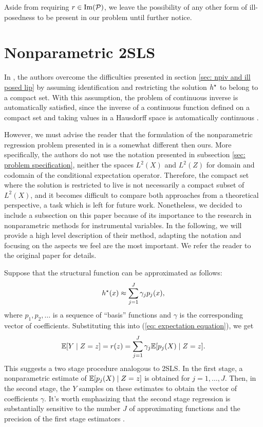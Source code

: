 Aside from requiring $ r \in \operatorname{Im} ( \mathcal{P} ) $, we leave the possibility of any other form of ill-posedness to be present in our problem until further notice.

\section{Nonparametric 2SLS}

In \cite{newey2003}, the authors overcome the difficulties presented in section \ref{sec: npiv and ill posed lip} by assuming identification and restricting the solution $ h^{ \star } $ to belong to a compact set.
With this assumption, the problem of continuous inverse is automatically satisfied, since the inverse of a continuous function defined on a compact set and taking values in a Hausdorff space is automatically continuous \cite{munkres2000}.

However, we must advise the reader that the formulation of the nonparametric regression problem presented in \cite{newey2003} is a somewhat different then ours.
More specifically, the authors do not use the notation presented in subsection \ref{sec: problem specification}, neither the spaces $ L^2 ( X ) $ and $ L^2 ( Z ) $ for domain and codomain of the conditional expectation operator.
Therefore, the compact set where the solution is restricted to live is not necessarily a compact subset of $ L^{ 2 } ( X ) $, and it becomes difficult to compare both approaches from a theoretical perspective, a task which is left for future work.
Nonetheless, we decided to include a subsection on this paper because of its importance to the research in nonparametric methods for instrumental variables.
In the following, we will provide a high level description of their method, adapting the notation and focusing on the aspects we feel are the most important.
We refer the reader to the original paper for details.

Suppose that the structural function can be approximated as follows:
\begin{equation}
    \label{eq: expansion on basis functions}
    h^{ \star } ( x ) \approx \sum_{ j=1 }^{ J } \gamma_{ j } p_{ j } ( x )
,\end{equation}
where $ p_{ 1 }, p_{ 2 }, \dots $ is a sequence of ``basis'' functions and $ \gamma $ is the corresponding vector of coefficients.
Substituting this into (\ref{eq: expectation equation}), we get
\begin{equation}
    \label{eq: projected expansion}
    \mathbb{E} [ Y \mid Z = z ] = r ( z ) = \sum_{ j=1 }^{ J } \gamma_{ j } \mathbb{E} [ p_{ j } ( X ) \mid Z = z ]
.\end{equation}
This suggests a two stage procedure analogous to 2SLS.
In the first stage, a nonparametric estimate of $ \mathbb{E} [ p_{ j } ( X ) \mid Z = z ] $ is obtained for $ j = 1, \dots, J $.
Then, in the second stage, the $ Y $ samples on these estimates to obtain the vector of coefficients $ \gamma $.
It's worth emphasizing that the second stage regression is substantially sensitive to the number $ J $ of approximating functions and the precision of the first stage estimators \cite{newey2003}.

